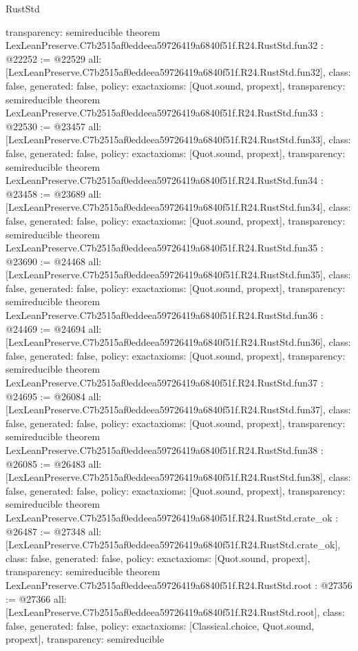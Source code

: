\begin{lexlean}{RustStd}
\begin{coremodule}
{  transparency: semireducible
}
theorem LexLeanPreserve.C7b2515af0eddeea59726419a6840f51f.R24.RustStd.fun32 : @22252 := @22529 {
  all: [LexLeanPreserve.C7b2515af0eddeea59726419a6840f51f.R24.RustStd.fun32],
  class: false,
  generated: false,
  policy: exact{axioms: [Quot.sound, propext]},
  transparency: semireducible
}
theorem LexLeanPreserve.C7b2515af0eddeea59726419a6840f51f.R24.RustStd.fun33 : @22530 := @23457 {
  all: [LexLeanPreserve.C7b2515af0eddeea59726419a6840f51f.R24.RustStd.fun33],
  class: false,
  generated: false,
  policy: exact{axioms: [Quot.sound, propext]},
  transparency: semireducible
}
theorem LexLeanPreserve.C7b2515af0eddeea59726419a6840f51f.R24.RustStd.fun34 : @23458 := @23689 {
  all: [LexLeanPreserve.C7b2515af0eddeea59726419a6840f51f.R24.RustStd.fun34],
  class: false,
  generated: false,
  policy: exact{axioms: [Quot.sound, propext]},
  transparency: semireducible
}
theorem LexLeanPreserve.C7b2515af0eddeea59726419a6840f51f.R24.RustStd.fun35 : @23690 := @24468 {
  all: [LexLeanPreserve.C7b2515af0eddeea59726419a6840f51f.R24.RustStd.fun35],
  class: false,
  generated: false,
  policy: exact{axioms: [Quot.sound, propext]},
  transparency: semireducible
}
theorem LexLeanPreserve.C7b2515af0eddeea59726419a6840f51f.R24.RustStd.fun36 : @24469 := @24694 {
  all: [LexLeanPreserve.C7b2515af0eddeea59726419a6840f51f.R24.RustStd.fun36],
  class: false,
  generated: false,
  policy: exact{axioms: [Quot.sound, propext]},
  transparency: semireducible
}
theorem LexLeanPreserve.C7b2515af0eddeea59726419a6840f51f.R24.RustStd.fun37 : @24695 := @26084 {
  all: [LexLeanPreserve.C7b2515af0eddeea59726419a6840f51f.R24.RustStd.fun37],
  class: false,
  generated: false,
  policy: exact{axioms: [Quot.sound, propext]},
  transparency: semireducible
}
theorem LexLeanPreserve.C7b2515af0eddeea59726419a6840f51f.R24.RustStd.fun38 : @26085 := @26483 {
  all: [LexLeanPreserve.C7b2515af0eddeea59726419a6840f51f.R24.RustStd.fun38],
  class: false,
  generated: false,
  policy: exact{axioms: [Quot.sound, propext]},
  transparency: semireducible
}
theorem LexLeanPreserve.C7b2515af0eddeea59726419a6840f51f.R24.RustStd.crate_ok : @26487 := @27348 {
  all: [LexLeanPreserve.C7b2515af0eddeea59726419a6840f51f.R24.RustStd.crate_ok],
  class: false,
  generated: false,
  policy: exact{axioms: [Quot.sound, propext]},
  transparency: semireducible
}
theorem LexLeanPreserve.C7b2515af0eddeea59726419a6840f51f.R24.RustStd.root : @27356 := @27366 {
  all: [LexLeanPreserve.C7b2515af0eddeea59726419a6840f51f.R24.RustStd.root],
  class: false,
  generated: false,
  policy: exact{axioms: [Classical.choice, Quot.sound, propext]},
  transparency: semireducible
}


\end{coremodule}
\end{lexlean}
